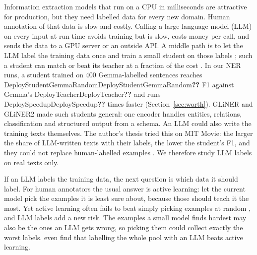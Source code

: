 \documentclass[11pt]{article}
\newcommand{\res}[1]{\ifcsname #1\endcsname\csname #1\endcsname\else\textbf{??}\fi}
\begin{document}
Information extraction models that run on a CPU in milliseconds are attractive for production, but they need labelled data for every new domain. Human annotation of that data is slow and costly. Calling a large language model (LLM) on every input at run time avoids training but is slow, costs money per call, and sends the data to a GPU server or an outside API. A middle path is to let the LLM label the training data once and train a small student on those labels \citep{llmaaa2023,llmsloop2024}; such a student can match or beat its teacher at a fraction of the cost \citep{clinicalie2025}. In our NER runs, a student trained on 400 Gemma-labelled sentences reaches \res{DeployStudentGemmaRandom} F1 against Gemma's \res{DeployTeacher} and runs \res{DeploySpeedup} times faster (Section~\ref{sec:worth}). GLiNER \citep{gliner2023} and GLiNER2 \citep{gliner2_2025} made such students general: one encoder handles entities, relations, classification and structured output from a schema. An LLM could also write the training texts themselves. The author's thesis tried this on MIT Movie: the larger the share of LLM-written texts with their labels, the lower the student's F1, and they could not replace human-labelled examples \citep{thomas2025thesis}. We therefore study LLM labels on real texts only.

If an LLM labels the training data, the next question is which data it should label. For human annotators the usual answer is active learning: let the current model pick the examples it is least sure about, because those should teach it the most. Yet active learning often fails to beat simply picking examples at random \citep{fragility2024,chemal2026,partingillusions2019}, and LLM labels add a new risk. The examples a small model finds hardest may also be the ones an LLM gets wrong, so picking them could collect exactly the worst labels. \citet{humansloop2026} even find that labelling the whole pool with an LLM beats active learning.
\end{document}
